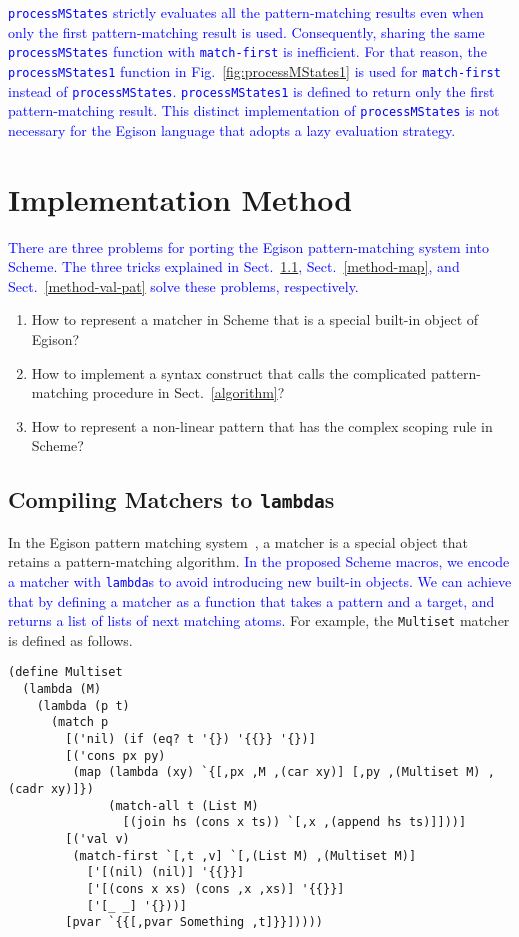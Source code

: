 \documentclass[acmlarge]{acmart}
\newcommand{\new}[1]{\textcolor{blue}{#1}}
\begin{document}
\new{
\texttt{processMStates} strictly evaluates all the pattern-matching results even when only the first pattern-matching result is used.
Consequently, sharing the same \texttt{processMStates} function with \texttt{match-first} is inefficient.
For that reason, the \texttt{processMStates1} function in Fig.~\ref{fig:processMStates1} is used for \texttt{match-first} instead of \texttt{processMStates}.
\texttt{processMStates1} is defined to return only the first pattern-matching result.
This distinct implementation of \lstinline{processMStates} is not necessary for the Egison language that adopts a lazy evaluation strategy.
}%

\section{Implementation Method}\label{method}

\new{
There are three problems for porting the Egison pattern-matching system into Scheme.
The three tricks explained in Sect.~\ref{method-matcher}, Sect.~\ref{method-map}, and Sect.~\ref{method-val-pat} solve these problems, respectively.
}%

\begin{enumerate}
\item How to represent a matcher in Scheme that is a special built-in object of Egison?
\item How to implement a syntax construct that calls the complicated pattern-matching procedure in Sect.~\ref{algorithm}?
\item How to represent a non-linear pattern that has the complex scoping rule in Scheme?
\end{enumerate}

\subsection{Compiling Matchers to \lstinline{lambda}s}\label{method-matcher}

In the Egison pattern matching system~\cite{egi2018aplas}, a matcher is a special object that retains a pattern-matching algorithm.
\new{
In the proposed Scheme macros, we encode a matcher with \texttt{lambda}s to avoid introducing new built-in objects.
We can achieve that by defining a matcher as a function that takes a pattern and a target, and returns a list of lists of next matching atoms.
}%
For example, the \lstinline{Multiset} matcher is defined as follows.

\begin{lstlisting}[language=egison]
(define Multiset
  (lambda (M)
    (lambda (p t)
      (match p
        [('nil) (if (eq? t '{}) '{{}} '{})]
        [('cons px py)
         (map (lambda (xy) `{[,px ,M ,(car xy)] [,py ,(Multiset M) ,(cadr xy)]})
              (match-all t (List M)
                [(join hs (cons x ts)) `[,x ,(append hs ts)]]))]
        [('val v)
         (match-first `[,t ,v] `[,(List M) ,(Multiset M)]
           ['[(nil) (nil)] '{{}}]
           ['[(cons x xs) (cons ,x ,xs)] '{{}}]
           ['[_ _] '{}))]
        [pvar `{{[,pvar Something ,t]}}]))))
\end{lstlisting}
\end{document}

